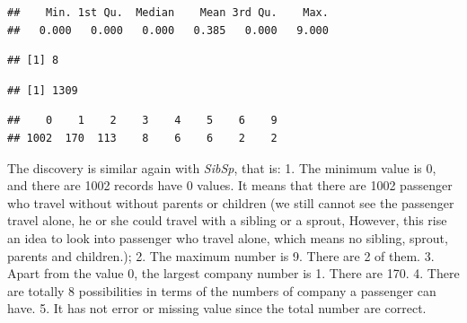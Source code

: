 \documentclass[
]{book}
\newenvironment{Shaded}{\begin{snugshade}}{\end{snugshade}}
\newcommand{\CommentTok}[1]{\textcolor[rgb]{0.56,0.35,0.01}{\textit{#1}}}
\newcommand{\KeywordTok}[1]{\textcolor[rgb]{0.13,0.29,0.53}{\textbf{#1}}}
\newcommand{\NormalTok}[1]{#1}
\newcommand{\OperatorTok}[1]{\textcolor[rgb]{0.81,0.36,0.00}{\textbf{#1}}}
\newcommand{\StringTok}[1]{\textcolor[rgb]{0.31,0.60,0.02}{#1}}
\begin{document}
\begin{verbatim}
##    Min. 1st Qu.  Median    Mean 3rd Qu.    Max. 
##   0.000   0.000   0.000   0.385   0.000   9.000
\end{verbatim}

\begin{Shaded}
\end{Shaded}

\begin{verbatim}
## [1] 8
\end{verbatim}

\begin{Shaded}
\end{Shaded}

\begin{verbatim}
## [1] 1309
\end{verbatim}

\begin{Shaded}
\end{Shaded}

\begin{verbatim}
##    0    1    2    3    4    5    6    9 
## 1002  170  113    8    6    6    2    2
\end{verbatim}

The discovery is similar again with \emph{SibSp}, that is:
1. The minimum value is 0, and there are 1002 records have 0 values. It means that there are 1002 passenger who travel without without parents or children (we still cannot see the passenger travel alone, he or she could travel with a sibling or a sprout, However, this rise an idea to look into passenger who travel alone, which means no sibling, sprout, parents and children.);
2. The maximum number is 9. There are 2 of them.
3. Apart from the value 0, the largest company number is 1. There are 170.
4. There are totally 8 possibilities in terms of the numbers of company a passenger can have.
5. It has not error or missing value since the total number are correct.
\end{document}
